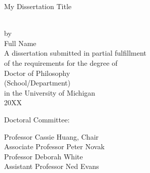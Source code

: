 \begin{titlepage}
 \begin{singlespace} %
  \hbox{\vspace{1.2in}} %
  \begin{center} %
   \begin{onehalfspacing}
    { My Dissertation Title } %
   \end{onehalfspacing} \\[4ex] %
   by \\[2ex] %
   Full Name \\ %
   \vfill %
   A dissertation submitted in partial fulfillment \\ %
   of the requirements for the degree of \\ %
   Doctor of Philosophy \\ %
   (School/Department) \\ %
   in the University of Michigan \\ %
   20XX %
  \end{center} %
  \vfill %
  \begin{flushleft}
   \hspace{0.7in}Doctoral Committee: \\[2ex] %
   \hspace{1in} %
   \parbox{4.2in}{Professor Cassie Huang, Chair\\
                  Associate Professor Peter Novak\\
                  Professor Deborah White\\
                  Assistant Professor Ned Evans\\}
  \end{flushleft} %
 \end{singlespace} %
\end{titlepage}

\clearpage
\thispagestyle{empty}

\hspace{0pt}

